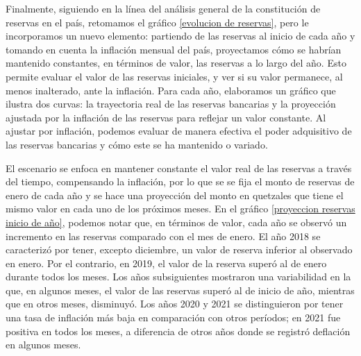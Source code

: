 Finalmente, siguiendo en la línea del análisis general de la constitución de reservas en el país, retomamos el gráfico \ref{evolucion de reservas}, pero le incorporamos un nuevo elemento: partiendo de las reservas al inicio de cada año y tomando en cuenta la inflación mensual del país, proyectamos cómo se habrían mantenido constantes, en términos de valor, las reservas a lo largo del año. Esto permite evaluar el valor de las reservas iniciales, y ver si su valor permanece, al menos inalterado, ante la inflación.  Para cada año, elaboramos un gráfico que ilustra dos curvas: la trayectoria real de las reservas bancarias y la proyección ajustada por la inflación de las reservas para reflejar un valor constante. Al ajustar por inflación, podemos evaluar de manera efectiva el poder adquisitivo de las reservas bancarias y cómo este se ha mantenido o variado.

El  escenario  se enfoca en mantener constante el valor real de las reservas a través del tiempo, compensando la inflación, por lo que se se fija el monto de reservas de enero de cada año y se hace una proyección del monto en quetzales que tiene el mismo valor en cada uno de los próximos meses. En el gráfico \ref{proyeccion reservas inicio de año}, podemos notar que, en términos de valor, cada año se observó un incremento en las reservas comparado con el mes de enero. El año 2018 se caracterizó por tener, excepto diciembre, un valor de reserva inferior al observado en enero. Por el contrario, en 2019, el valor de la reserva superó al de enero durante todos los meses. Los años subsiguientes mostraron una variabilidad en la que, en algunos meses, el valor de las reservas superó al de inicio de año, mientras que en otros meses, disminuyó. Los años 2020 y 2021 se distinguieron por tener una tasa de inflación más baja en comparación con otros períodos; en 2021 fue positiva en todos los meses, a diferencia de otros años donde se registró deflación en algunos meses.




